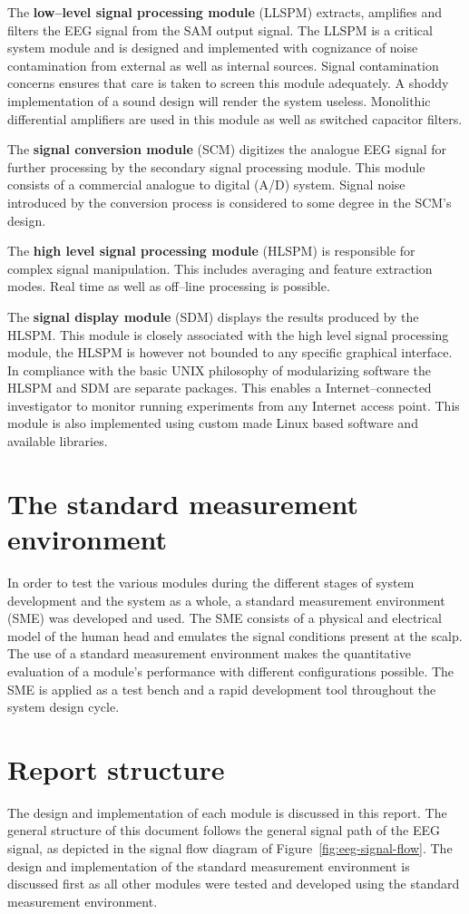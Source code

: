 The \textbf{low--level signal processing module} (LLSPM) extracts,
amplifies and filters the EEG signal from the SAM output signal. The
LLSPM is a critical system module and is designed and implemented with
cognizance of noise contamination from external as well as internal
sources. Signal contamination concerns ensures that care is taken to
screen this module adequately. A shoddy implementation of a sound
design will render the system useless. Monolithic differential
amplifiers are used in this module as well as switched capacitor
filters. 


The \textbf{signal conversion module} (SCM) digitizes the analogue EEG
signal for further processing by the secondary signal processing
module. This module consists of a commercial analogue to digital (A/D)
system. Signal noise introduced by the conversion process is
considered to some degree in the SCM's design.

The \textbf{high level signal processing module} (HLSPM) is
responsible for complex signal manipulation. This includes averaging
and feature extraction modes. Real time as well as off--line
processing is possible. 


The \textbf{signal display module} (SDM) displays the results produced
by the HLSPM. This module is closely associated with the high level
signal processing module, the HLSPM is however not bounded to any
specific graphical interface. In compliance with the basic UNIX
philosophy of modularizing software the HLSPM and SDM are separate
packages. This enables a Internet--connected investigator to monitor
running experiments from any Internet access point. This module is
also implemented using custom made Linux based software and available
libraries.


\section{The standard measurement environment}
In order to test the various modules during the different stages of
system development and the system as a whole, a standard measurement
environment (SME) was developed and used. The SME consists of a
physical and electrical model of the human head and emulates the
signal conditions present at the scalp. The use of a standard
measurement environment makes the quantitative evaluation of a
module's performance with different configurations possible. The SME
is applied as a test bench and a rapid development tool throughout
the system design cycle.


\section{Report structure}
The design and implementation of each module is discussed in this
report. The general structure of this document follows the general
signal path of the EEG signal, as depicted in the signal flow diagram
of Figure~\vref{fig:eeg-signal-flow}. The design and implementation of
the standard measurement environment is discussed first as all other
modules were tested and developed using the standard measurement
environment.



